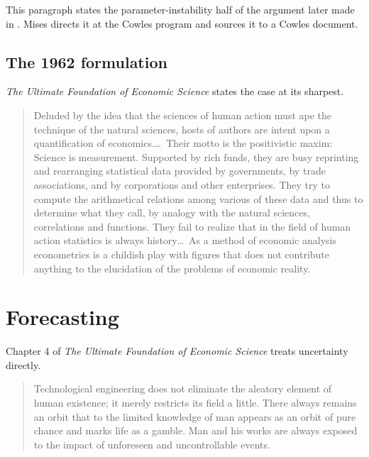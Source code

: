 \documentclass[12pt]{article}
\begin{document}
This paragraph states the parameter-instability half of the argument later made
in \citet{Lucas1976}.  Mises directs it at the Cowles program and sources it to
a Cowles document.

\subsection{The 1962 formulation}

\emph{The Ultimate Foundation of Economic Science} states the case at its
sharpest.

\begin{quote}
Deluded by the idea that the sciences of human action must ape the technique of
the natural sciences, hosts of authors are intent upon a quantification of
economics.\ldots\ Their motto is the positivistic maxim: Science is measurement.
Supported by rich funds, they are busy reprinting and rearranging statistical
data provided by governments, by trade associations, and by corporations and
other enterprises.  They try to compute the arithmetical relations among various
of these data and thus to determine what they call, by analogy with the natural
sciences, correlations and functions.  They fail to realize that in the field of
human action statistics is always history\ldots\ As a method of economic
analysis econometrics is a childish play with figures that does not contribute
anything to the elucidation of the problems of economic reality.
\hfill \citep[p.~63]{Mises1962Ultimate}
\end{quote}

\section{Forecasting}
\label{sec:forecasting}

Chapter 4 of \emph{The Ultimate Foundation of Economic Science} treats
uncertainty directly.

\begin{quote}
Technological engineering does not eliminate the aleatory element of human
existence; it merely restricts its field a little.  There always remains an
orbit that to the limited knowledge of man appears as an orbit of pure chance
and marks life as a gamble.  Man and his works are always exposed to the impact
of unforeseen and uncontrollable events.
\hfill \citep[pp.~64--65]{Mises1962Ultimate}
\end{quote}
\end{document}
